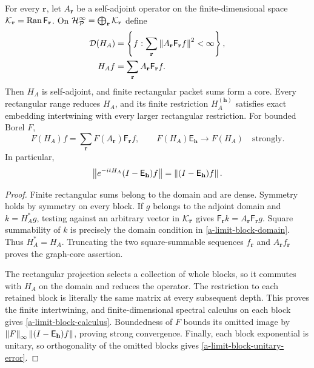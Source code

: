 \begin{theorem}
\label{a-limit-block-hamiltonian}
For every $\mathbf r$, let $A_{\mathbf r}$ be a self-adjoint operator on
the finite-dimensional space
$\mathcal K_{\mathbf r}=\operatorname{Ran}\mathsf F_{\mathbf r}$.
On $\mathcal H_{\mathcal P}^{\infty}=\bigoplus_{\mathbf r}\mathcal K_{\mathbf r}$ define
\begin{align}
 \mathcal D(H_A)&=\left\{f:\sum_{\mathbf r}
 \left\lVert A_{\mathbf r}\mathsf F_{\mathbf r}f\right\rVert^2<\infty\right\},
 \nonumber\\
 H_A f&=\sum_{\mathbf r}A_{\mathbf r}\mathsf F_{\mathbf r}f.
 \label{a-limit-block-domain}
\end{align}
Then $H_A$ is self-adjoint, and finite rectangular packet sums form a
core. Every rectangular range reduces $H_A$, and its finite restriction
$H_A^{(\mathbf h)}$ satisfies exact embedding intertwining with every
larger rectangular restriction. For bounded Borel $F$,
\begin{equation}
 F(H_A)f=\sum_{\mathbf r}F(A_{\mathbf r})\mathsf F_{\mathbf r}f,
 \qquad
 F(H_A)\mathsf E_{\mathbf h}\to F(H_A)
 \quad\text{strongly}.
 \label{a-limit-block-calculus}
\end{equation}
In particular,
\begin{equation}
 \left\lVert e^{-itH_A}(I-\mathsf E_{\mathbf h})f\right\rVert
 =\left\lVert(I-\mathsf E_{\mathbf h})f\right\rVert.
 \label{a-limit-block-unitary-error}
\end{equation}
\end{theorem}
\begin{proof}
Finite rectangular sums belong to the domain and are dense. Symmetry
holds by symmetry on every block. If $g$ belongs to the adjoint domain
and $k=H_A^*g$, testing against an arbitrary vector in
$\mathcal K_{\mathbf r}$ gives
$\mathsf F_{\mathbf r}k=A_{\mathbf r}\mathsf F_{\mathbf r}g$.
Square summability of $k$ is precisely the domain condition in
\eqref{a-limit-block-domain}. Thus $H_A^*=H_A$. Truncating the two
square-summable sequences $f_{\mathbf r}$ and
$A_{\mathbf r}f_{\mathbf r}$ proves the graph-core assertion.

The rectangular projection selects a collection of whole blocks, so it
commutes with $H_A$ on the domain and reduces the operator.
The restriction to each retained block is literally the same matrix at
every subsequent depth. This proves the finite intertwining, and
finite-dimensional spectral calculus on each block gives
\eqref{a-limit-block-calculus}. Boundedness of $F$ bounds its omitted
image by $\left\lVert F\right\rVert_\infty\left\lVert(I-\mathsf E_{\mathbf h})f\right\rVert$, proving
strong convergence. Finally, each block exponential is unitary, so
orthogonality of the omitted blocks gives
\eqref{a-limit-block-unitary-error}.
\end{proof}


